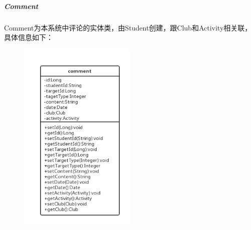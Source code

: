 \documentclass[UTF8]{ctexart}
\begin{document}
\subparagraph{Comment}
Comment为本系统中评论的实体类，由Student创建，跟Club和Activity相关联，具体信息如下：
\newline
\begin{figure}[H]
\centering
\includegraphics[width = 0.5\textwidth]{comment-class.png}
\end{figure}
\end{document}
